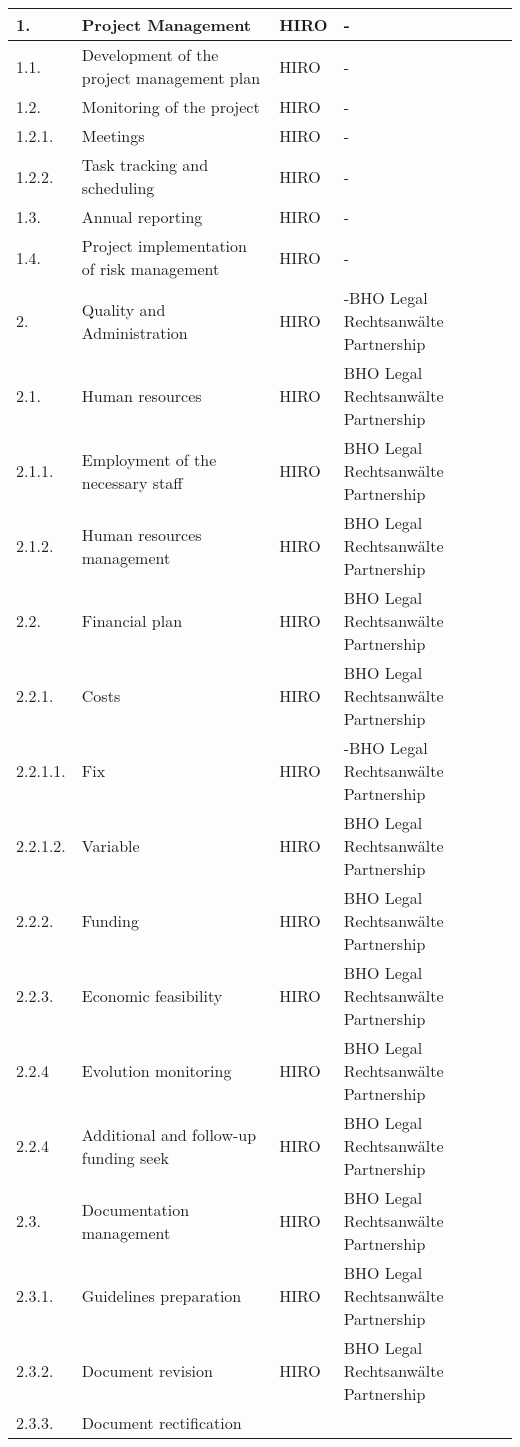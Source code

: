 \begin{longtable}[H]{l p{4cm} p{4cm} p{4cm}}
	1. & Project Management &HIRO&-
	\\  \midrule
	1.1. & Development of the project management plan &
	HIRO&-
	\\ \midrule
	1.2. & Monitoring of the project & 
	HIRO&-\\ \midrule
	1.2.1. & Meetings &
	HIRO&-
	\\ \midrule
	1.2.2. & Task tracking and scheduling &
	HIRO&-
	\\ \midrule
	1.3. & Annual reporting &
	HIRO&-
	\\ \midrule
	1.4. & Project implementation of risk management & 
	HIRO&-
	\\ \midrule
	2. & Quality and Administration & 
	HIRO&-BHO Legal Rechtsanwälte Partnership
	\\ \midrule
	2.1. & Human resources &
	HIRO&BHO Legal Rechtsanwälte Partnership
	\\ \midrule
	2.1.1. & Employment of the necessary staff & 
	HIRO&BHO Legal Rechtsanwälte Partnership
	\\ \midrule
	2.1.2. & Human resources management &
	HIRO&BHO Legal Rechtsanwälte Partnership
	\\ \midrule
	2.2. & Financial plan &
	HIRO&BHO Legal Rechtsanwälte Partnership
	\\ \midrule
	2.2.1. & Costs &
	HIRO&BHO Legal Rechtsanwälte Partnership
	\\ \midrule
	2.2.1.1. & Fix &
	HIRO&-BHO Legal Rechtsanwälte Partnership
	\\ \midrule
	2.2.1.2. & Variable &
	HIRO&BHO Legal Rechtsanwälte Partnership
	\\ \midrule
	2.2.2. & Funding &
	HIRO&BHO Legal Rechtsanwälte Partnership
	\\ \midrule
	2.2.3. & Economic feasibility &
	HIRO&BHO Legal Rechtsanwälte Partnership
	\\ \midrule
	2.2.4 & Evolution monitoring &
	HIRO&BHO Legal Rechtsanwälte Partnership
	\\ \midrule
	2.2.4 & Additional and follow-up funding seek &
	HIRO&BHO Legal Rechtsanwälte Partnership
	\\ \midrule
	2.3. & Documentation management &
	HIRO&BHO Legal Rechtsanwälte Partnership
	\\ \midrule
	2.3.1. & Guidelines preparation &
	HIRO&BHO Legal Rechtsanwälte Partnership
	\\ \midrule
	2.3.2. & Document revision &
	HIRO&BHO Legal Rechtsanwälte Partnership
	\\ \midrule
	2.3.3. & Document rectification &

\end{longtable}
